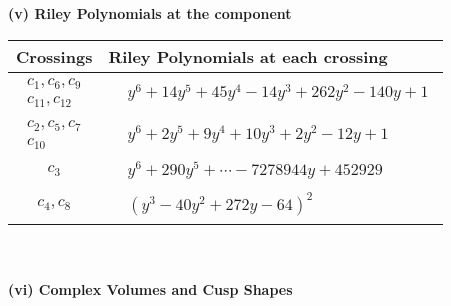 \documentclass[1p]{elsarticle_modified}
\theoremstyle{definition}
\begin{document}
\newpage\renewcommand{\arraystretch}{1}
\flushleft \textbf{(v) Riley Polynomials at the component}\newline \\
\begin{tabular}{m{50pt}|m{274pt}}
Crossings & \hspace{64pt}Riley Polynomials at each crossing \\
\hline $$\begin{aligned}c_{1},c_{6},c_{9}\\c_{11},c_{12}\end{aligned}$$&$\begin{aligned}
&y^6+14 y^5+45 y^4-14 y^3+262 y^2-140 y+1
\end{aligned}$\\
\hline $$\begin{aligned}c_{2},c_{5},c_{7}\\c_{10}\end{aligned}$$&$\begin{aligned}
&y^6+2 y^5+9 y^4+10 y^3+2 y^2-12 y+1
\end{aligned}$\\
\hline $$\begin{aligned}c_{3}\end{aligned}$$&$\begin{aligned}
&y^6+290 y^5+\cdots-7278944 y+452929
\end{aligned}$\\
\hline $$\begin{aligned}c_{4},c_{8}\end{aligned}$$&$\begin{aligned}
&(y^3-40 y^2+272 y-64)^2
\end{aligned}$\\
\hline
\end{tabular}\\~\\
\newpage\flushleft \textbf{(vi) Complex Volumes and Cusp Shapes}
\end{document}
